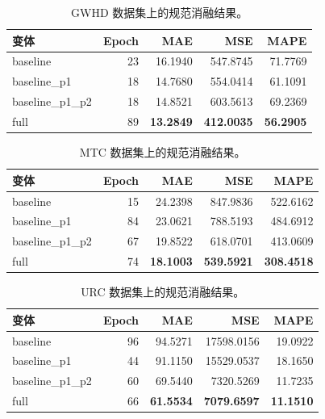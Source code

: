 \documentclass[a4paper,fleqn]{cas-sc}
\newcommand{\tablesize}{\small}
\begin{document}
\begin{table}[!htbp]
    \centering
    \caption{GWHD 数据集上的规范消融结果。}
    \label{tab:gwhd_ablation}
    \tablesize
    \setlength{\tabcolsep}{6pt}
    \begin{tabular}{@{}lrrrr@{}}
        \toprule
        变体 & Epoch & MAE & MSE & MAPE \\
        \midrule
        baseline         & 23 & 16.1940 & 547.8745 & 71.7769 \\
        baseline\_p1     & 18 & 14.7680 & 554.0414 & 61.1091 \\
        baseline\_p1\_p2 & 18 & 14.8521 & 603.5613 & 69.2369 \\
        full             & 89 & \textbf{13.2849} & \textbf{412.0035} & \textbf{56.2905} \\
        \bottomrule
    \end{tabular}
\end{table}

\begin{table}[!htbp]
    \centering
    \caption{MTC 数据集上的规范消融结果。}
    \label{tab:mtc_ablation}
    \tablesize
    \setlength{\tabcolsep}{6pt}
    \begin{tabular}{@{}lrrrr@{}}
        \toprule
        变体 & Epoch & MAE & MSE & MAPE \\
        \midrule
        baseline         & 15 & 24.2398 & 847.9836 & 522.6162 \\
        baseline\_p1     & 84 & 23.0621 & 788.5193 & 484.6912 \\
        baseline\_p1\_p2 & 67 & 19.8522 & 618.0701 & 413.0609 \\
        full             & 74 & \textbf{18.1003} & \textbf{539.5921} & \textbf{308.4518} \\
        \bottomrule
    \end{tabular}
\end{table}

\begin{table}[!htbp]
    \centering
    \caption{URC 数据集上的规范消融结果。}
    \label{tab:urc_ablation}
    \tablesize
    \setlength{\tabcolsep}{6pt}
    \begin{tabular}{@{}lrrrr@{}}
        \toprule
        变体 & Epoch & MAE & MSE & MAPE \\
        \midrule
        baseline         & 96 & 94.5271 & 17598.0156 & 19.0922 \\
        baseline\_p1     & 44 & 91.1150 & 15529.0537 & 18.1650 \\
        baseline\_p1\_p2 & 60 & 69.5440 & 7320.5269 & 11.7235 \\
        full             & 66 & \textbf{61.5534} & \textbf{7079.6597} & \textbf{11.1510} \\
        \bottomrule
    \end{tabular}
\end{table}
\end{document}
